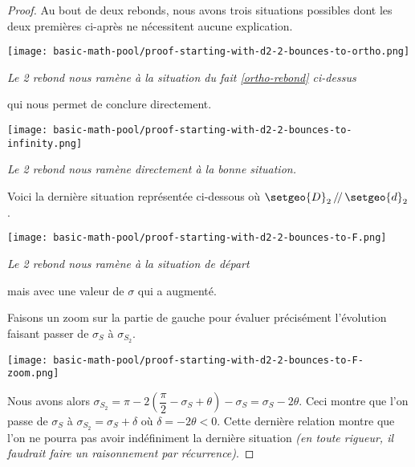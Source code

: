 \begin{proof}
	Au bout de deux rebonds, nous avons trois situations possibles dont les deux premières ci-après ne nécessitent aucune explication.
	
	
	\medskip
	
	\begin{center}
		\texttt{[image: basic-math-pool/proof-starting-with-d2-2-bounces-to-ortho.png]}

		\itshape\small
		Le 2\ieme{} rebond nous ramène à la situation du fait \ref{ortho-rebond} ci-dessus
		
		qui nous permet de conclure directement.
	\end{center}
	
	
	\medskip
	
	\begin{center}
		\texttt{[image: basic-math-pool/proof-starting-with-d2-2-bounces-to-infinity.png]}

		\itshape\small
		Le 2\ieme{} rebond nous ramène directement à la bonne situation.
	\end{center}
	
	
	\medskip
	
	Voici la dernière situation représentée ci-dessous où $\setgeo{D}_2 \, /\!/ \, \setgeo{d}_2$.
	
	
	\medskip
	
	\begin{center}
		\texttt{[image: basic-math-pool/proof-starting-with-d2-2-bounces-to-F.png]}

		\itshape\small
		Le 2\ieme{} rebond nous ramène à la situation de départ
		
		mais avec une valeur de $\sigma$ qui a augmenté.
	\end{center}
	
	
	\medskip
	
	Faisons un zoom sur la partie de gauche pour évaluer précisément l'évolution faisant passer de $\sigma_S$ à $\sigma_{S_2}$.
	
	\begin{center}
		\texttt{[image: basic-math-pool/proof-starting-with-d2-2-bounces-to-F-zoom.png]}
	\end{center}
	
	
	\medskip
	
	Nous avons alors $\sigma_{S_2} = \pi - 2 \left( \dfrac{\pi}{2} - \sigma_S + \theta \right) - \sigma_S = \sigma_S - 2 \theta$.
	Ceci montre que l'on passe de $\sigma_S$ à $\sigma_{S_2} = \sigma_S + \delta$ où $\delta = - 2 \theta < 0$. Cette dernière relation montre que l'on ne pourra pas avoir indéfiniment la dernière situation \emph{(en toute rigueur, il faudrait faire un raisonnement par récurrence)}.  
\end{proof}


